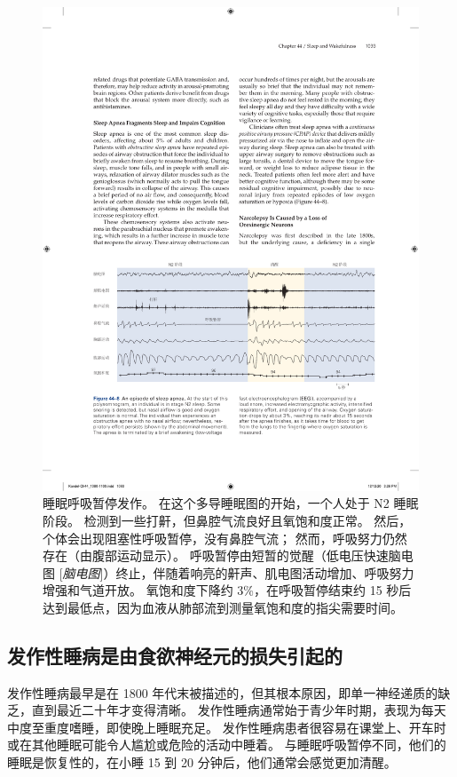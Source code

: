\begin{figure}[htbp]
	\centering
	\includegraphics[width=1.0\linewidth]{chap44/fig_44_8}
	\caption{睡眠呼吸暂停发作。
		在这个多导睡眠图的开始，一个人处于 N2 睡眠阶段。
		检测到一些打鼾，但鼻腔气流良好且氧饱和度正常。
		然后，个体会出现阻塞性呼吸暂停，没有鼻腔气流；
		然而，呼吸努力仍然存在（由腹部运动显示）。
		呼吸暂停由短暂的觉醒（低电压快速脑电图 [\textit{脑电图}]）终止，伴随着响亮的鼾声、肌电图活动增加、呼吸努力增强和气道开放。
		氧饱和度下降约 3\%，在呼吸暂停结束约 15 秒后达到最低点，因为血液从肺部流到测量氧饱和度的指尖需要时间。}
	\label{fig:44_8}
\end{figure}


\subsection{发作性睡病是由食欲神经元的损失引起的}

发作性睡病最早是在 1800 年代末被描述的，但其根本原因，即单一神经递质的缺乏，直到最近二十年才变得清晰。
发作性睡病通常始于青少年时期，表现为每天中度至重度嗜睡，即使晚上睡眠充足。
发作性睡病患者很容易在课堂上、开车时或在其他睡眠可能令人尴尬或危险的活动中睡着。
与睡眠呼吸暂停不同，他们的睡眠是恢复性的，在小睡 15 到 20 分钟后，他们通常会感觉更加清醒。


